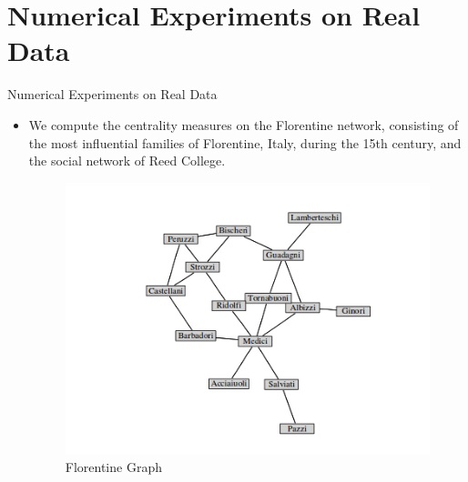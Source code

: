 \documentclass{beamer}
\begin{document}
\section{Numerical Experiments on Real Data}   \label{sec:NumExpReal}
\begin{frame}{Numerical Experiments on Real Data}
\begin{itemize}
\item We compute the centrality measures on the Florentine network, consisting of the most influential families of Florentine, Italy, during the 15th century, and the social network of Reed College. 
\begin{figure}[h]
\begin{center}
\includegraphics[width=0.50\columnwidth]{florentine.png}
\end{center}
\caption{Florentine Graph}
\label{fig:Florentine}
\end{figure}
\end{itemize}
\end{frame}
\end{document}
